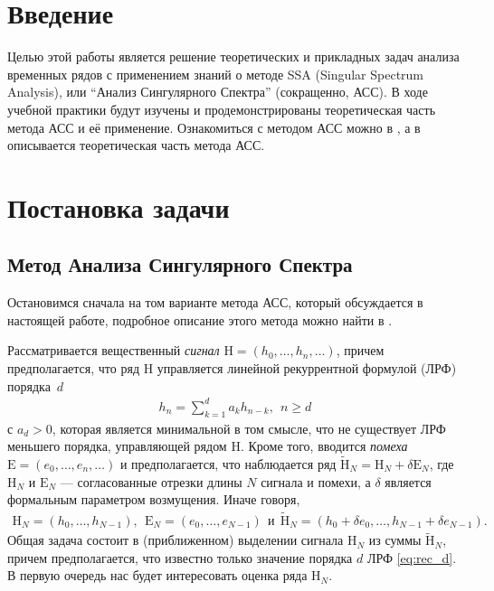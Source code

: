 \documentclass[specialist,
               substylefile = spbu_report.rtx,
               subf,href,colorlinks=true, 12pt]{disser}
\begin{document}
\section{Введение}
Целью этой работы является решение теоретических и прикладных задач анализа временных рядов с применением знаний о методе SSA (Singular Spectrum Analysis), или ``Анализ Сингулярного Спектра'' (сокращенно, АСС). В ходе учебной практики будут изучены и продемонстрированы теоретическая часть метода АСС и её применение. Ознакомиться с методом АСС можно в \cite{GNZh01}, а в  \cite{Nekrutkin10} описывается теоретическая часть метода АСС.

\section{Постановка задачи}

\subsection{Метод Анализа Сингулярного Спектра}
\label{ssect:SSA}
Остановимся сначала на том варианте метода АСС, который обсуждается в настоящей работе,  подробное
описание этого  метода
можно найти в \cite{GNZh01}.

Рассматривается вещественный \emph{сигнал} $\mathrm{H}=(h_0,\ldots, h_n,\ldots)$, причем предполагается, что ряд $\mathrm{H}$ управляется линейной
рекуррентной формулой  (ЛРФ) порядка~$d$
\begin{gather}
	\label{eq:rec_d}
	h_n = \sum\limits_{k=1}^d a_kh_{n-k}, \ \ n \geqslant d
\end{gather}
с $a_d>0$, которая является минимальной в том смысле, что  не существует ЛРФ меньшего порядка, управляющей рядом $\mathrm{H}$.
Кроме того, вводится \emph{помеха} $\mathrm{E}=(e_0,\ldots, e_n,\ldots)$ и предполагается, что наблюдается ряд $\widetilde{\mathrm{H}}_N=\mathrm{H}_N+\delta
\mathrm{E}_N$, где  $\mathrm{H}_N$ и $\mathrm{E}_N$ --- согласованные отрезки длины $N$ сигнала и помехи, а
$\delta$ является формальным параметром возмущения. Иначе говоря,
\begin{gather*}
	\mathrm{H}_N=(h_0, \ldots, h_{N-1}), \ \ \mathrm{E}_N=(e_0, \ldots, e_{N-1}) \ \ \text{и}\ \
	\widetilde{\mathrm{H}}_N=(h_0+\delta e_0, \ldots, h_{N-1}+\delta e_{N-1}).
\end{gather*}
Общая задача состоит в (приближенном) выделении сигнала $\mathrm{H}_N$ из суммы $\widetilde{\mathrm{H}}_N$, причем предполагается, что известно только
значение порядка $d$ ЛРФ \eqref{eq:rec_d}.
В первую очередь нас будет интересовать оценка ряда $\mathrm{H}_N$.
\end{document}
